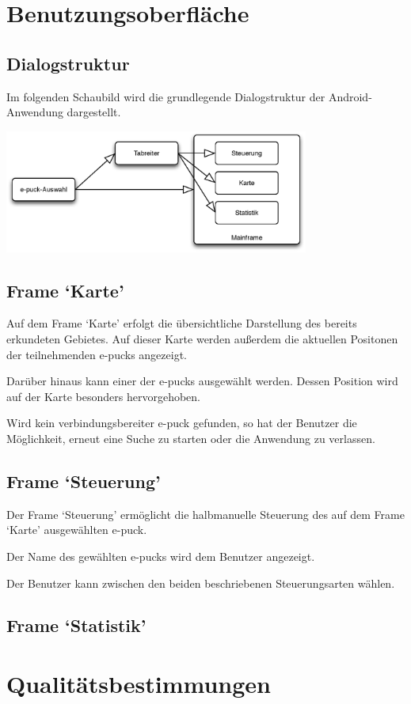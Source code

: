 \documentclass[10pt,a4paper]{article}
\begin{document}
	\section{Benutzungsoberfläche}
	
			\subsection{Dialogstruktur}
			Im folgenden Schaubild wird die grundlegende Dialogstruktur der Android-Anwendung dargestellt.
			
			\includegraphics[width=10cm]{dialog.eps}
			
			\subsection{Frame `Karte'}
			Auf dem Frame `Karte' erfolgt die übersichtliche Darstellung des bereits erkundeten Gebietes. Auf dieser Karte werden außerdem
			die aktuellen Positonen der teilnehmenden e-pucks angezeigt.
			
			Darüber hinaus kann einer der e-pucks ausgewählt werden. Dessen Position wird auf der Karte besonders hervorgehoben.
			
			Wird kein verbindungsbereiter e-puck gefunden, so hat der Benutzer die Möglichkeit, erneut eine Suche zu starten oder die Anwendung
			zu verlassen.
			\subsection{Frame `Steuerung'}
			Der Frame `Steuerung' ermöglicht die halbmanuelle Steuerung des auf dem Frame `Karte' ausgewählten e-puck.
			
			Der Name des gewählten e-pucks wird dem Benutzer angezeigt.
			
			Der Benutzer kann zwischen den beiden beschriebenen Steuerungsarten wählen.
			\subsection{Frame `Statistik'}
	\section{Qualitätsbestimmungen}
		
\end{document}
